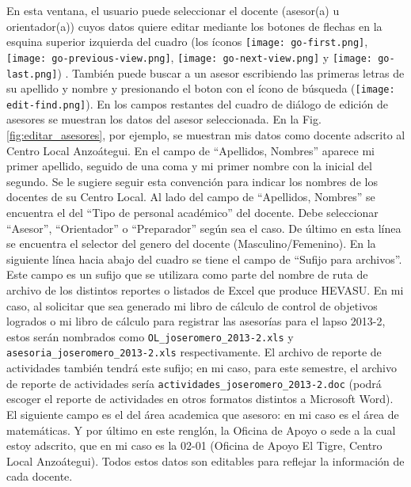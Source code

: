 \documentclass[letterpaper,12pt]{book}
\newcommand{\archivo}[1]
{\texttt{#1}}
\begin{document}
En esta ventana, el usuario puede seleccionar el docente (asesor(a) u orientador(a)) cuyos datos quiere editar mediante los botones de flechas en la esquina superior izquierda del cuadro (los íconos \texttt{[image: go-first.png]}, \texttt{[image: go-previous-view.png]}, \texttt{[image: go-next-view.png]} y \texttt{[image: go-last.png]}) . También puede buscar a un asesor escribiendo las primeras letras de su apellido y nombre y presionando el boton con el ícono de búsqueda (\texttt{[image: edit-find.png]}). En los campos restantes del cuadro de diálogo de edición de asesores se muestran los datos del asesor seleccionada. En la Fig. \ref{fig:editar_asesores}, por ejemplo, se muestran mis datos como docente adscrito al Centro Local Anzoátegui. En el campo de ``Apellidos, Nombres'' aparece mi primer apellido, seguido de una coma y mi primer nombre con la inicial del segundo. Se le sugiere seguir esta convención para indicar los nombres de los docentes de su Centro Local. Al lado del campo de ``Apellidos, Nombres'' se encuentra el del ``Tipo de personal académico'' del docente. Debe seleccionar ``Asesor'', ``Orientador'' o ``Preparador'' según sea el caso. De último en esta línea se encuentra el selector del genero del docente (Masculino/Femenino).  En la siguiente línea hacia abajo del cuadro se tiene el campo de ``Sufijo para archivos''. Este campo es un sufijo que se utilizara como parte del nombre de ruta de archivo de los distintos reportes o listados de Excel que produce HEVASU. En mi caso, al solicitar que sea generado mi libro de cálculo de control de objetivos logrados o mi libro de cálculo para registrar las asesorías para el lapso 2013-2, estos serán nombrados como \archivo{OL\_joseromero\_2013-2.xls} y \archivo{asesoria\_joseromero\_2013-2.xls} respectivamente. El archivo de reporte de actividades también tendrá este sufijo; en mi caso, para este semestre, el archivo de reporte de actividades sería \archivo{actividades\_joseromero\_2013-2.doc} (podrá escoger el reporte de actividades en otros formatos distintos a Microsoft Word). El siguiente campo es el del área academica que asesoro: en mi caso es el área de matemáticas.  Y por último en este renglón, la Oficina de Apoyo o sede a la cual estoy adscrito, que en mi caso es la 02-01 (Oficina de Apoyo El Tigre, Centro Local Anzoátegui).  Todos estos datos son editables para reflejar la información de cada docente.
\end{document}
